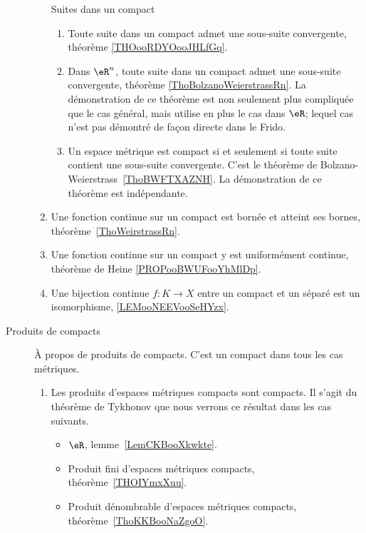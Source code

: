 \begin{description}
\begin{enumerate}
		            Suites dans un compact
		            \begin{enumerate}
			            \item
			                  Toute suite dans un compact admet une sous-suite convergente, théorème \ref{THOooRDYOooJHLfGq}.
			            \item
			                  Dans \( \eR^n\), toute suite dans un compact admet une sous-suite convergente, théorème \ref{ThoBolzanoWeierstrassRn}. La démonstration de ce théorème est non seulement plus compliquée que le cas général, mais utilise en plus le cas dans \( \eR\); lequel cas n'est pas démontré de façon directe dans le Frido.
			            \item
			                  Un espace métrique est compact si et seulement si toute suite contient une sous-suite convergente. C'est le théorème de Bolzano-Weierstrass~\ref{ThoBWFTXAZNH}. La démonstration de ce théorème est indépendante.
		            \end{enumerate}
		      \item
		            Une fonction continue sur un compact est bornée et atteint ses bornes, théorème~\ref{ThoWeirstrassRn}.
		      \item
		            Une fonction continue sur un compact y est uniformément continue, théorème de Heine \ref{PROPooBWUFooYhMlDp}.
                \item
                    Une bijection continue \( f\colon K\to X\) entre un compact et un séparé est un isomorphisme, \ref{LEMooNEEVooSeHYzx}.
	      \end{enumerate}

	\item[Produits de compacts]
	      À propos de produits de compacts. C'est un compact dans tous les cas métriques.
	      \begin{enumerate}
		      \item
		            Les produits d'espaces métriques compacts sont compacts. Il s'agit du théorème de Tykhonov que nous verrons ce résultat dans les cas suivants.
		            \begin{itemize}
			            \item
			                  \( \eR\), lemme~\ref{LemCKBooXkwkte}.
			            \item
			                  Produit fini d'espaces métriques compacts, théorème~\ref{THOIYmxXuu}.
			            \item
			                  Produit dénombrable d'espaces métriques compacts, théorème~\ref{ThoKKBooNaZgoO}.
		            \end{itemize}
	      \end{enumerate}
\end{description}


